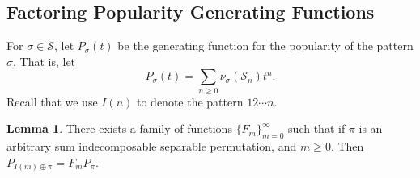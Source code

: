 \documentclass[10pt]{article}
\theoremstyle{definition}
\newtheorem{lemma}[theorem]{Lemma}
\numberwithin{equation}{section}
\numberwithin{figure}{section}
\begin{document}
\subsection{Factoring Popularity Generating Functions}

For $\sigma \in \mathcal{S}$, let $P_\sigma(t)$ be the generating function for the popularity of the pattern $\sigma$. That is, let 
\[
P_\sigma(t) = \sum_{n \geq 0} \nu_\sigma\left(\mathcal{S}_n\right)t^n.
\] 
Recall that we use $I(n)$ to denote the pattern $1 2 \cdots n$. 

%

\begin{lemma}\label{lem:factorization}
There exists a family of functions $\{F_m\}_{m=0}^\infty$ such that if $\pi$ is an arbitrary sum indecomposable separable permutation, and $m \geq 0$. Then $P_{I(m) \oplus \pi} = F_m P_\pi$. 
\end{lemma}
\end{document}
